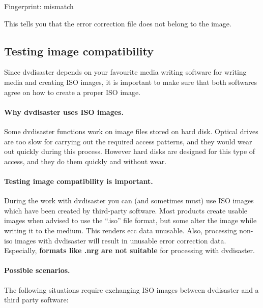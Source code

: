 \medskip

Fingerprint: \textcolor{dkred}{mismatch}

\medskip

This tells you that the error correction file does not belong to the image. 

\newpage
\subsection{Testing image compatibility}
\label{howto-compat-overview}

Since dvdisaster depends on your favourite media writing software for writing media and creating
ISO images, it is important to make sure that both softwares
agree on how to create a proper ISO image.

\paragraph{Why dvdisaster uses ISO images.} Some dvdisaster functions work on 
image files stored on hard disk. Optical drives are too slow for carrying out 
the required access patterns, and they would wear out quickly during this process. 
However hard disks are designed for this type of access, and they do them quickly and without wear.

\paragraph{Testing image compatibility is important.} During the work with dvdisaster you 
can (and sometimes must) use ISO images which have been created by third-party software. 
Most products create usable images when advised to use the “.iso” file format, but some
alter the image while writing it to the medium. This renders ecc data unusable. Also,
processing non-iso images with dvdisaster will result in unusable error correction data. 
Especially, {\bf formats like .nrg are not suitable} for processing with dvdisaster.

\paragraph{Possible scenarios.} The following situations require 
exchanging ISO images between dvdisaster and a third party software:

